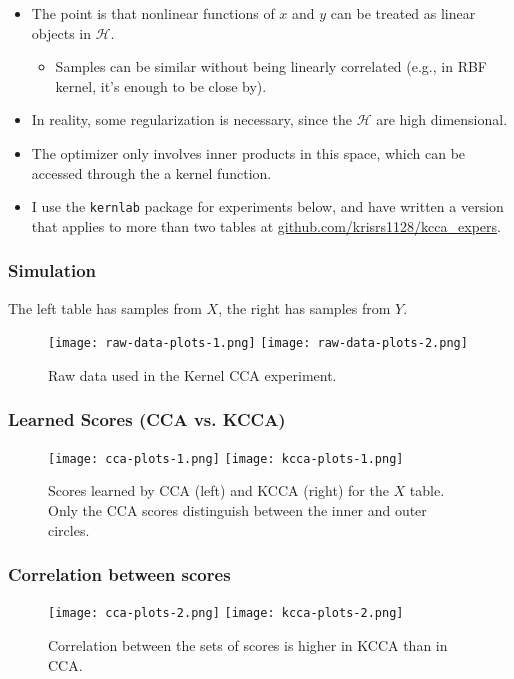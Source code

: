 \documentclass[10pt]{beamer}\usepackage[]{graphicx}\usepackage[]{color}
\begin{document}
\begin{frame}
\begin{itemize}
  \item The point is that nonlinear functions of $x$ and $y$ can be treated
    as linear objects in $\mathcal{H}$.
    \begin{itemize}
    \item Samples can be similar without being linearly correlated
      (e.g., in RBF kernel, it's enough to be close by).
    \end{itemize}
  \item In reality, some regularization is necessary, since the $\mathcal{H}$
    are high dimensional.
  \item The optimizer only involves inner products in this space, which
    can be accessed through the a kernel function.
  \item I use the \texttt{kernlab} package for experiments below, and have
    written a version that applies to more than two tables at \url{github.com/krisrs1128/kcca_expers}.
\end{itemize}
\end{frame}

\begin{frame}
  \frametitle{Simulation}
  The left table has samples from $X$, the right has samples from $Y$.
  \begin{figure}
    \texttt{[image: raw-data-plots-1.png]}
    \texttt{[image: raw-data-plots-2.png]}
    \caption{Raw data used in the Kernel CCA experiment.}
  \end{figure}
\end{frame}

\begin{frame}
  \frametitle{Learned Scores (CCA vs. KCCA)}
    \begin{figure}
      \texttt{[image: cca-plots-1.png]}
      \texttt{[image: kcca-plots-1.png]}
      \caption{Scores learned by CCA (left) and KCCA (right) for the $X$ table.
        Only the CCA scores distinguish between the inner and
        outer circles.}
    \end{figure}
\end{frame}

\begin{frame}
  \frametitle{Correlation between scores}
    \begin{figure}
      \texttt{[image: cca-plots-2.png]}
      \texttt{[image: kcca-plots-2.png]}
      \caption{Correlation between the sets of scores is higher in KCCA than in CCA.}
    \end{figure}
\end{frame}
\end{document}
